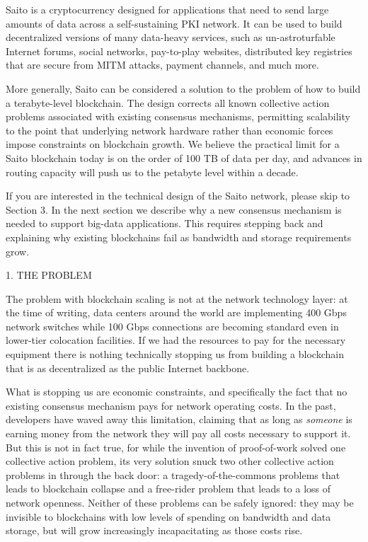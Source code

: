 \documentclass[11.5pt, oneside]{article}   	%
\begin{document}
\begin{multicols}{2}
Saito is a cryptocurrency designed for applications that need to send large amounts of data across a self-sustaining PKI network. It can be used to build decentralized versions of many data-heavy services, such as un-astroturfable Internet forums, social networks, pay-to-play websites, distributed key registries that are secure from MITM attacks, payment channels, and much more.

More generally, Saito can be considered a solution to the problem of how to build a terabyte-level blockchain. The design corrects all known collective action problems associated with existing consensus mechanisms, permitting scalability to the point that underlying network hardware rather than economic forces impose constraints on blockchain growth. We believe the practical limit for a Saito blockchain today is on the order of 100 TB of data per day, and advances in routing capacity will push us to the petabyte level within a decade.

If you are interested in the technical design of the Saito network, please skip to Section 3. In the next section we describe why a new consensus mechanism is needed to support big-data applications. This requires stepping back and explaining why existing blockchains fail as bandwidth and storage requirements grow.


1. THE PROBLEM

The problem with blockchain scaling is not at the network technology layer: at the time of writing, data centers around the world are implementing 400 Gbps network switches while 100 Gbps connections are becoming standard even in lower-tier colocation facilities. If we had the resources to pay for the necessary equipment there is nothing technically stopping us from building a blockchain that is as decentralized as the public Internet backbone.

What is stopping us are economic constraints, and specifically the fact that no existing consensus mechanism pays for network operating costs. In the past, developers have waved away this limitation, claiming that as long as {\textit{someone}} is earning money from the network they will pay all costs necessary to support it. But this is not in fact true, for while the invention of proof-of-work solved one collective action problem, its very solution snuck two other collective action problems in through the back door: a tragedy-of-the-commons problems that leads to blockchain collapse and a free-rider problem that leads to a loss of network openness. Neither of these problems can be safely ignored: they may be invisible to blockchains with low levels of spending on bandwidth and data storage, but will grow increasingly incapacitating as those costs rise.


\end{multicols}
\end{document}
